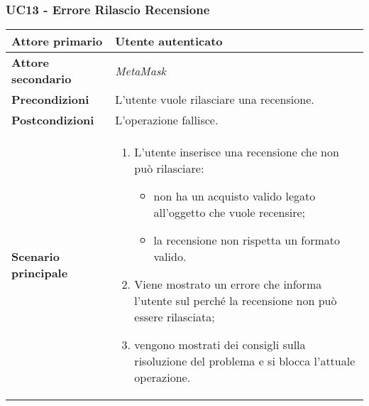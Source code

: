 \subsubsection{UC13 - Errore Rilascio Recensione}
\label{UC13}
\begin{center}
\renewcommand{\arraystretch}{1.5}
\begin{tabular}{ | m{10em} | m{20em} | }
    \hline
    \textbf{Attore primario} & Utente autenticato \\
    \hline
    \textbf{Attore secondario} & \textit{MetaMask} \\
    \hline
    \textbf{Precondizioni} & L'utente vuole rilasciare una recensione. \\
    \hline
    \textbf{Postcondizioni} & L'operazione fallisce. \\
    \hline
    \textbf{Scenario principale} & \begin{enumerate}
        \item L'utente inserisce una recensione che non può rilasciare:
              \begin{itemize}
                  \item non ha un acquisto valido legato all'oggetto che vuole recensire;
                  \item la recensione non rispetta un formato valido.
              \end{itemize}
        \item Viene mostrato un errore che informa l'utente sul perché la recensione non può
              essere rilasciata;
        \item vengono mostrati dei consigli sulla risoluzione del problema e si blocca
              l'attuale operazione.
    \end{enumerate} \\
    \hline
   \end{tabular}
\end{center}

